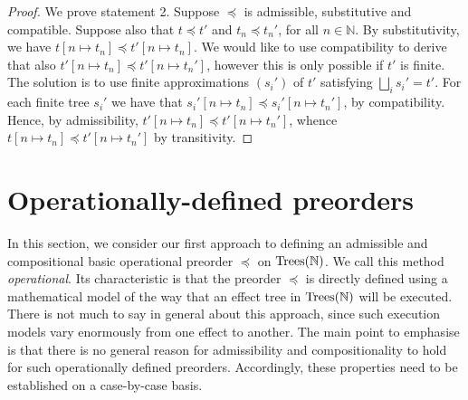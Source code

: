 \documentclass[a4paper,UKenglish]{lipics-v2018}
\newcommand{\Nat}{\mathbb{N}}
\newcommand{\Trees}{\textnormal{Trees}}
\newcommand{\Basicleq}{\preccurlyeq}
\theoremstyle{plain}
\begin{document}
\begin{proof}
We prove statement 2.
%
            Suppose $\Basicleq$ is admissible, substitutive and compatible. 
            Suppose also that $t \Basicleq t'$ and $t_n \Basicleq t_n'$, for all $n \in \mathbb{N}$.
            By substitutivity, we have $t[n \mapsto t_n] \Basicleq t'[n \mapsto t_n]$.
             We would like to use compatibility to derive 
            that also $t'[n \mapsto t_n] \Basicleq t'[n \mapsto
            t_n']$, however this is only possible if $t'$ is finite. 
            The solution is to use finite approximations $(s_i')$ of $t'$
            satisfying $\bigsqcup_i s_i' = t'$. For each finite tree $s_i'$
            we have that $s_i'[n \mapsto t_n] \Basicleq s_i'[n \mapsto t_n']$, by compatibility.
            Hence, by admissibility, $t'[n \mapsto t_n] \Basicleq t'[n \mapsto
            t_n']$, whence $t[n \mapsto t_n] \Basicleq t'[n \mapsto t_n']$ by transitivity.
\end{proof}

\section{Operationally-defined preorders}
\label{section:operational}

In this section, we consider our first approach to defining an admissible and compositional basic operational
preorder $\Basicleq$ on $\Trees(\mathbb{N})$. We call this method \emph{operational}. Its characteristic is that the preorder
 $\Basicleq$ is directly defined using a mathematical model of the way that an effect tree in $\Trees(\mathbb{\Nat})$ will be executed.
There is not much to say in general about this approach, since such execution models vary enormously from one effect to another.
The main point to emphasise is that there is no general reason for  admissibility and compositionality to hold for such operationally defined preorders. Accordingly, these properties need to be established on a case-by-case basis.
\end{document}
